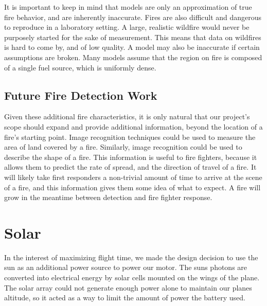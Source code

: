 \documentclass[12pt,journal,compsoc]{IEEEtran}
\begin{document}
It is important to keep in mind that models are only an approximation of true fire behavior, and are inherently inaccurate. Fires are also difficult and dangerous to reproduce in a laboratory setting. A large, realistic wildfire would never be purposely started for the sake of measurement. This means that data on wildfires is hard to come by, and of low quality. A model may also be inaccurate if certain assumptions are broken. Many models assume that the region on fire is composed of a single fuel source, which is uniformly dense.

\subsection{Future Fire Detection Work}
Given these additional fire characteristics, it is only natural that our project's scope should expand and provide additional information, beyond the location of a fire's starting point. Image recognition techniques could be used to measure the area of land covered by a fire. Similarly, image recognition could be used to describe the shape of a fire. This information is useful to fire fighters, because it allows them to predict the rate of spread, and the direction of travel of a fire. It will likely take first responders a non-trivial amount of time to arrive at the scene of a fire, and this information gives them some idea of what to expect. A fire will grow in the meantime between detection and fire fighter response. 

\section{Solar}
In the interest of maximizing flight time, we made the design decision to use the sun as an additional power source to power our motor. The suns photons are converted into electrical energy by solar cells mounted on the wings of the plane. The solar array could not generate enough power alone to maintain our planes altitude, so it acted as a way to limit the amount of power the battery used. 
\end{document}
